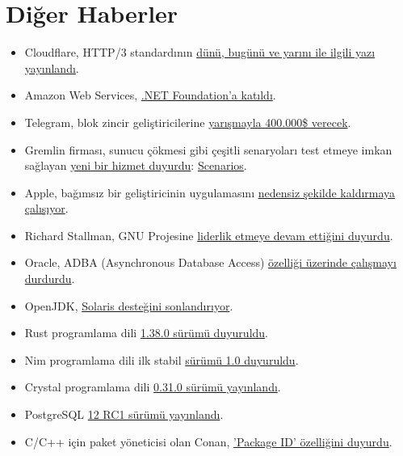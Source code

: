 \documentclass[11pt]{article}
\begin{document}
\section{Diğer Haberler}
\label{sec:org639fa5b}
\begin{itemize}
\item Cloudflare, HTTP/3 standardının \href{https://blog.cloudflare.com/http3-the-past-present-and-future/}{dünü, bugünü ve yarını ile ilgili yazı
yayınlandı}.
\item Amazon Web Services, \href{https://aws.amazon.com/blogs/opensource/aws-joins-the-net-foundation}{.NET Foundation'a katıldı}.
\item Telegram, blok zincir geliştiricilerine \href{https://luvcrypto.com/telegram-blockchain-coding-competition/}{yarışmayla 400.000\$ verecek}.
\item Gremlin firması, sunucu çökmesi gibi çeşitli senaryoları test etmeye
imkan sağlayan \href{https://www.gremlin.com/blog/introducing-scenarios/}{yeni bir hizmet duyurdu}: \href{https://www.gremlin.com/try-scenarios/}{Scenarios}.
\item Apple, bağımsız bir geliştiricinin uygulamasını \href{https://github.com/glushchenko/fsnotes/issues/695}{nedensiz şekilde kaldırmaya
çalışıyor}.
\item Richard Stallman, GNU Projesine \href{https://lists.gnu.org/archive/html/info-gnu/2019-09/msg00008.html}{liderlik etmeye devam ettiğini duyurdu}.
\item Oracle, ADBA (Asynchronous Database Access) \href{https://mail.openjdk.java.net/pipermail/jdbc-spec-discuss/2019-September/000529.html}{özelliği üzerinde çalışmayı
durdurdu}.
\item OpenJDK, \href{https://openjdk.java.net/jeps/362}{Solaris desteğini sonlandırıyor}.
\item Rust programlama dili \href{https://blog.rust-lang.org/2019/09/26/Rust-1.38.0.html}{1.38.0 sürümü duyuruldu}.
\item Nim programlama dili ilk stabil \href{https://nim-lang.org/blog/2019/09/23/version-100-released.html}{sürümü 1.0 duyuruldu}.
\item Crystal programlama dili \href{https://crystal-lang.org/2019/09/23/crystal-0.31.0-released.html}{0.31.0 sürümü yayınlandı}.
\item PostgreSQL \href{https://www.postgresql.org/about/news/1975/}{12 RC1 sürümü yayınlandı}.
\item C/C++ için paket yöneticisi olan Conan, \href{https://blog.conan.io/2019/09/27/package-id-modes.html}{'Package ID' özelliğini duyurdu}.

\end{itemize}
\end{document}
